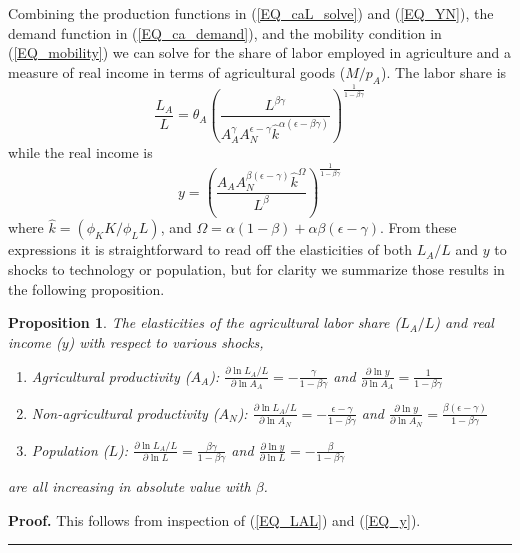 \documentclass[11pt]{article}
\newtheorem{proposition}{Proposition}
\newenvironment{proof}[1][Proof]{\noindent\textbf{#1.} }{\ \rule{0.5em}{0.5em}}
\begin{document}
Combining the production functions in (\ref{EQ_caL_solve}) and (\ref{EQ_YN}), the demand function in (\ref{EQ_ca_demand}), and the mobility condition in (\ref{EQ_mobility}) we can solve for the share of labor employed in agriculture and a measure of real income in terms of agricultural goods ($M/p_A$). The labor share is
\begin{equation}
	\frac{L_A}{L} = \theta_A \left(\frac{L^{\beta\gamma}}{A_A^{\gamma} A_N^{\epsilon - \gamma} \hat{k}^{\alpha(\epsilon - \beta\gamma)}}\right)^{\frac{1}{1-\beta\gamma}} \label{EQ_LAL}
\end{equation}
while the real income is
\begin{equation}
	y = \left(\frac{A_A A_N^{\beta(\epsilon-\gamma)}\hat{k}^{\Omega}}{L^{\beta}} \right)^{\frac{1}{1-\beta\gamma}} \label{EQ_y}
\end{equation}
where $\hat{k} = (\phi_K K/\phi_L L)$, and $\Omega = \alpha(1-\beta) + \alpha\beta(\epsilon-\gamma)$. From these expressions it is straightforward to read off the elasticities of both $L_A/L$ and $y$ to shocks to technology or population, but for clarity we summarize those results in the following proposition. 

\begin{proposition}
The elasticities of the agricultural labor share ($L_A/L$) and real income ($y$) with respect to various shocks,
\begin{enumerate}
	\item[(a)] Agricultural productivity ($A_A$): $\frac{\partial \ln L_A/L}{\partial \ln A_A} = - \frac{\gamma}{1-\beta\gamma}$ and $\frac{\partial \ln y}{\partial \ln A_A} = \frac{1}{1-\beta\gamma}$
	\item[(b)] Non-agricultural productivity ($A_N$): $\frac{\partial \ln L_A/L}{\partial \ln A_N} = - \frac{\epsilon-\gamma}{1-\beta\gamma}$ and $\frac{\partial \ln y}{\partial \ln A_N} = \frac{\beta(\epsilon-\gamma)}{1-\beta\gamma}$
	\item[(c)] Population ($L$): $\frac{\partial \ln L_A/L}{\partial \ln L} = \frac{\beta\gamma}{1-\beta\gamma}$ and $\frac{\partial \ln y}{\partial \ln L} = - \frac{\beta}{1-\beta\gamma}$
\end{enumerate}
are all increasing in absolute value with $\beta$.
\end{proposition}
\begin{proof}
This follows from inspection of (\ref{EQ_LAL}) and (\ref{EQ_y}).
\end{proof}
\end{document}
